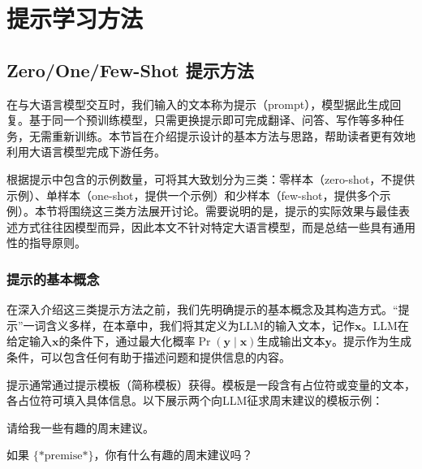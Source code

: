 \section{提示学习方法}

\subsection{Zero/One/Few-Shot 提示方法}

在与大语言模型交互时，我们输入的文本称为提示（prompt），模型据此生成回复。基于同一个预训练模型，只需更换提示即可完成翻译、问答、写作等多种任务，无需重新训练。本节旨在介绍提示设计的基本方法与思路，帮助读者更有效地利用大语言模型完成下游任务。

根据提示中包含的示例数量，可将其大致划分为三类：零样本（zero-shot，不提供示例）、单样本（one-shot，提供一个示例）和少样本（few-shot，提供多个示例）。本节将围绕这三类方法展开讨论。需要说明的是，提示的实际效果与最佳表述方式往往因模型而异，因此本文不针对特定大语言模型，而是总结一些具有通用性的指导原则。

\subsubsection{提示的基本概念}

在深入介绍这三类提示方法之前，我们先明确提示的基本概念及其构造方式。“提示”一词含义多样，在本章中，我们将其定义为LLM的输入文本，记作$\mathbf{x}$。LLM在给定输入$\mathbf{x}$的条件下，通过最大化概率$\Pr(\mathbf{y}\mid\mathbf{x})$生成输出文本$\mathbf{y}$。提示作为生成条件，可以包含任何有助于描述问题和提供信息的内容。

提示通常通过提示模板（简称模板）\cite{liu-etal:2023pre}获得。模板是一段含有占位符或变量的文本，各占位符可填入具体信息。以下展示两个向LLM征求周末建议的模板示例：

\vspace{0.5em}
\begin{tcolorbox}

\hspace{2em} 请给我一些有趣的周末建议。

\hspace{2em} \underline{\hspace{2em}}
\end{tcolorbox}
\vspace{0.5em}

\vspace{0.5em}
\begin{tcolorbox}

\hspace{2em} 如果 $\{*\mathrm{premise}*\}$，你有什么有趣的周末建议吗？

\hspace{2em} \underline{\hspace{2em}}
\end{tcolorbox}
\vspace{0.5em}

